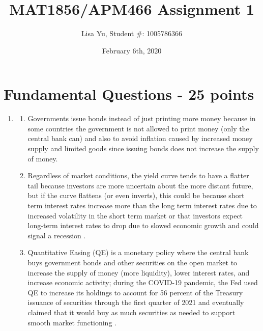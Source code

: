 \documentclass{article}
\title{MAT1856/APM466 Assignment 1}
\author{Lisa Yu, Student \#: 1005786366}
\date{February 6th, 2020}
\begin{document}
\maketitle

\section*{Fundamental Questions - 25 points}

\begin{enumerate}
    \item \hfill
    \begin{enumerate}
        \item Governments issue bonds instead of just printing more money because in some countries the government is not allowed to print money (only the central bank can) and also to avoid inflation caused by increased money supply and limited goods since issuing bonds does not increase the supply of money.
        \item Regardless of market conditions, the yield curve tends to have a flatter tail because investors are more uncertain about the more distant future, but if the curve flattens (or even inverts), this could be because short term interest rates increase more than the long term interest rates due to increased volatility in the short term market or that investors expect long-term interest rates to drop due to slowed economic growth and could signal a recession \cite{flatyield2023}. 
        \item Quantitative Easing (QE) is a monetary policy where the central bank buys government bonds and other securities on the open market to increase the supply of money (more liquidity), lower interest rates, and increase economic activity; during the COVID-19 pandemic, the Fed used QE to increase its holdings to account for 56 percent of the Treasury issuance of securities through the first quarter of 2021 and eventually claimed that it would buy as much securities as needed to support smooth market functioning \cite{milstein2022fed, team2023quantitative}.
    \end{enumerate}

\end{enumerate}
\end{document}
